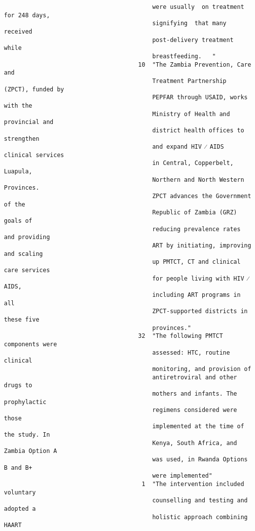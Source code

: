 \documentclass{article}
\begin{document}
\begin{verbatim}
                                          were usually  on treatment for 248 days,
                                          signifying  that many received
                                          post-delivery treatment while
                                          breastfeeding.   "
                                      10  "The Zambia Prevention, Care and
                                          Treatment Partnership (ZPCT), funded by
                                          PEPFAR through USAID, works with the
                                          Ministry of Health and provincial and
                                          district health offices to strengthen
                                          and expand HIV ⁄ AIDS clinical services
                                          in Central, Copperbelt, Luapula,
                                          Northern and North Western Provinces.
                                          ZPCT advances the Government of the
                                          Republic of Zambia (GRZ) goals of
                                          reducing prevalence rates and providing
                                          ART by initiating, improving and scaling
                                          up PMTCT, CT and clinical care services
                                          for people living with HIV ⁄ AIDS,
                                          including ART programs in all
                                          ZPCT-supported districts in these five
                                          provinces."
                                      32  "The following PMTCT components were
                                          assessed: HTC, routine clinical
                                          monitoring, and provision of
                                          antiretroviral and other drugs to
                                          mothers and infants. The prophylactic
                                          regimens considered were those
                                          implemented at the time of the study. In
                                          Kenya, South Africa, and Zambia Option A
                                          was used, in Rwanda Options B and B+
                                          were implemented"
                                       1  "The intervention included voluntary
                                          counselling and testing and adopted a
                                          holistic approach combining HAART

\end{verbatim}
\end{document}
